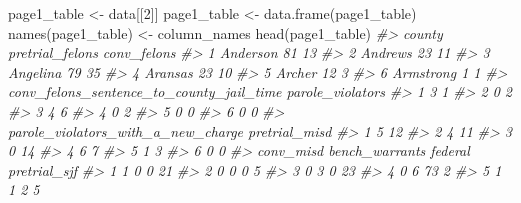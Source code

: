 \documentclass[
]{krantz}
\makeatletter
\newenvironment{Shaded}{\begin{snugshade}}{\end{snugshade}}
\newcommand{\CommentTok}[1]{\textcolor[rgb]{0.37,0.37,0.37}{\textit{#1}}}
\newcommand{\DecValTok}[1]{\textcolor[rgb]{0.06,0.06,0.06}{#1}}
\newcommand{\FunctionTok}[1]{\textcolor[rgb]{0,0,0}{#1}}
\newcommand{\NormalTok}[1]{#1}
\newcommand{\OtherTok}[1]{\textcolor[rgb]{0.37,0.37,0.37}{#1}}
\newenvironment{kframe}{%
\medskip{}
\setlength{\fboxsep}{.8em}
 \def\at@end@of@kframe{}%
 \ifinner\ifhmode%
  \def\at@end@of@kframe{\end{minipage}}%
  \begin{minipage}{\columnwidth}%
 \fi\fi%
 \def\FrameCommand##1{\hskip\@totalleftmargin \hskip-\fboxsep
 \colorbox{shadecolor}{##1}\hskip-\fboxsep
     \hskip-\linewidth \hskip-\@totalleftmargin \hskip\columnwidth}%
 \MakeFramed {\advance\hsize-\width
   \@totalleftmargin\z@ \linewidth\hsize
   \@setminipage}}%
 {\par\unskip\endMakeFramed%
 \at@end@of@kframe}
\renewenvironment{Shaded}{\begin{kframe}}{\end{kframe}}
\makeatother
\begin{document}
\begin{Shaded}
\begin{Highlighting}[]
\NormalTok{page1\_table }\OtherTok{\textless{}{-}}\NormalTok{ data[[}\DecValTok{2}\NormalTok{]]}
\NormalTok{page1\_table }\OtherTok{\textless{}{-}} \FunctionTok{data.frame}\NormalTok{(page1\_table)}
\FunctionTok{names}\NormalTok{(page1\_table) }\OtherTok{\textless{}{-}}\NormalTok{ column\_names}
\FunctionTok{head}\NormalTok{(page1\_table)}
\CommentTok{\#\textgreater{}      county pretrial\_felons conv\_felons}
\CommentTok{\#\textgreater{} 1  Anderson              81          13}
\CommentTok{\#\textgreater{} 2   Andrews              23          11}
\CommentTok{\#\textgreater{} 3  Angelina              79          35}
\CommentTok{\#\textgreater{} 4   Aransas              23          10}
\CommentTok{\#\textgreater{} 5    Archer              12           3}
\CommentTok{\#\textgreater{} 6 Armstrong               1           1}
\CommentTok{\#\textgreater{}   conv\_felons\_sentence\_to\_county\_jail\_time parole\_violators}
\CommentTok{\#\textgreater{} 1                                        3                1}
\CommentTok{\#\textgreater{} 2                                        0                2}
\CommentTok{\#\textgreater{} 3                                        4                6}
\CommentTok{\#\textgreater{} 4                                        0                2}
\CommentTok{\#\textgreater{} 5                                        0                0}
\CommentTok{\#\textgreater{} 6                                        0                0}
\CommentTok{\#\textgreater{}   parole\_violators\_with\_a\_new\_charge pretrial\_misd}
\CommentTok{\#\textgreater{} 1                                  5            12}
\CommentTok{\#\textgreater{} 2                                  4            11}
\CommentTok{\#\textgreater{} 3                                  0            14}
\CommentTok{\#\textgreater{} 4                                  6             7}
\CommentTok{\#\textgreater{} 5                                  1             3}
\CommentTok{\#\textgreater{} 6                                  0             0}
\CommentTok{\#\textgreater{}   conv\_misd bench\_warrants federal pretrial\_sjf}
\CommentTok{\#\textgreater{} 1         1              0       0           21}
\CommentTok{\#\textgreater{} 2         0              0       0            5}
\CommentTok{\#\textgreater{} 3         0              3       0           23}
\CommentTok{\#\textgreater{} 4         0              6      73            2}
\CommentTok{\#\textgreater{} 5         1              1       2            5}

\end{Highlighting}
\end{Shaded}
\end{document}
